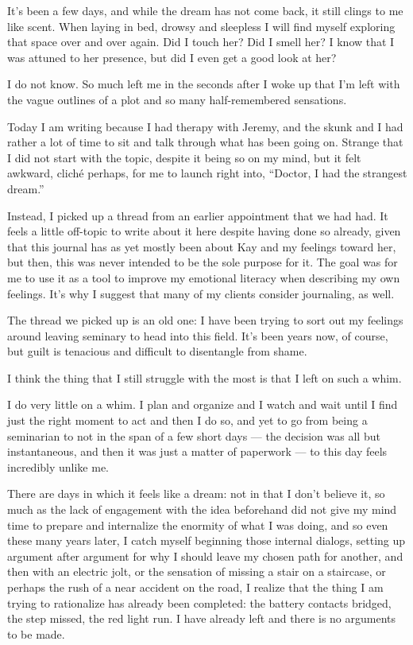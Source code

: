 It's been a few days, and while the dream has not come back, it still clings to me like scent. When laying in bed, drowsy and sleepless I will find myself exploring that space over and over again. Did I touch her? Did I smell her? I know that I was attuned to her presence, but did I even get a good look at her?

I do not know. So much left me in the seconds after I woke up that I'm left with the vague outlines of a plot and so many half-remembered sensations.

Today I am writing because I had therapy with Jeremy, and the skunk and I had rather a lot of time to sit and talk through what has been going on. Strange that I did not start with the topic, despite it being so on my mind, but it felt awkward, cliché perhaps, for me to launch right into, ``Doctor, I had the strangest dream.''

Instead, I picked up a thread from an earlier appointment that we had had. It feels a little off-topic to write about it here despite having done so already, given that this journal has as yet mostly been about Kay and my feelings toward her, but then, this was never intended to be the sole purpose for it. The goal was for me to use it as a tool to improve my emotional literacy when describing my own feelings. It's why I suggest that many of my clients consider journaling, as well.

The thread we picked up is an old one: I have been trying to sort out my feelings around leaving seminary to head into this field. It's been years now, of course, but guilt is tenacious and difficult to disentangle from shame.

I think the thing that I still struggle with the most is that I left on such a whim.

I do very little on a whim. I plan and organize and I watch and wait until I find just the right moment to act and then I do so, and yet to go from being a seminarian to not in the span of a few short days --- the decision was all but instantaneous, and then it was just a matter of paperwork --- to this day feels incredibly unlike me.

There are days in which it feels like a dream: not in that I don't believe it, so much as the lack of engagement with the idea beforehand did not give my mind time to prepare and internalize the enormity of what I was doing, and so even these many years later, I catch myself beginning those internal dialogs, setting up argument after argument for why I should leave my chosen path for another, and then with an electric jolt, or the sensation of missing a stair on a staircase, or perhaps the rush of a near accident on the road, I realize that the thing I am trying to rationalize has already been completed: the battery contacts bridged, the step missed, the red light run. I have already left and there is no arguments to be made.

